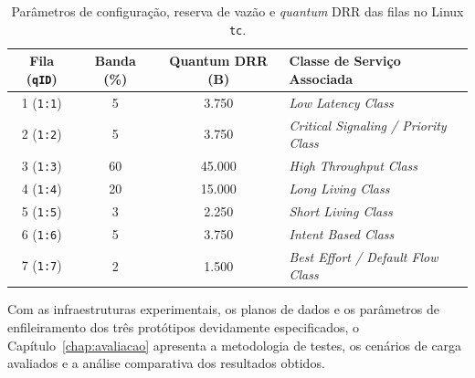 \begin{table}[htbp]
    \centering
    \caption{Parâmetros de configuração, reserva de vazão e \textit{quantum} DRR das filas no Linux \texttt{tc}.}
    \label{tab:filas_classe_servico}
    \begin{tabularx}{\textwidth}{cccX}
        \toprule
        \textbf{Fila (\texttt{qID})} & \textbf{Banda (\%)} & \textbf{Quantum DRR (B)} & \textbf{Classe de Serviço Associada} \\
        \midrule
        1 (\texttt{1:1}) & 5  & 3.750  & \textit{Low Latency Class} \\
        2 (\texttt{1:2}) & 5  & 3.750  & \textit{Critical Signaling / Priority Class} \\
        3 (\texttt{1:3}) & 60 & 45.000 & \textit{High Throughput Class} \\
        4 (\texttt{1:4}) & 20 & 15.000 & \textit{Long Living Class} \\
        5 (\texttt{1:5}) & 3  & 2.250  & \textit{Short Living Class} \\
        6 (\texttt{1:6}) & 5  & 3.750  & \textit{Intent Based Class} \\
        7 (\texttt{1:7}) & 2  & 1.500  & \textit{Best Effort / Default Flow Class} \\
        \bottomrule
    \end{tabularx}
\end{table}

Com as infraestruturas experimentais, os planos de dados e os parâmetros de enfileiramento dos três protótipos devidamente especificados, o Capítulo~\ref{chap:avaliacao} apresenta a metodologia de testes, os cenários de carga avaliados e a análise comparativa dos resultados obtidos.